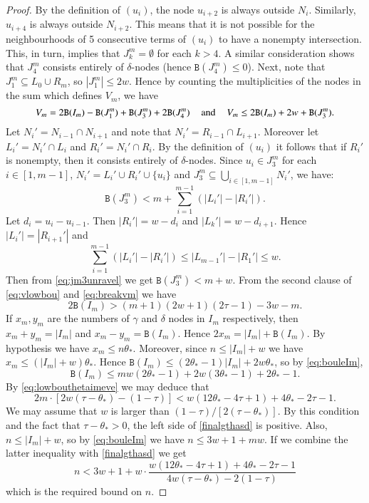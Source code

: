 \documentclass[11pt]{article}
\theoremstyle{plain}
\numberwithin{equation}{subsection}
\newcommand{\bias}[1]{\mathtt{B}(#1)}
\begin{document}
\begin{proof}
By the definition of $(u_i)$, the node $u_{i+2}$ is always outside $N_i$.
Similarly, $u_{i+4}$ is always outside $N_{i+2}$. 
This means that it is not possible for the neighbourhoods
of 5 consecutive terms of $(u_i)$ to have a nonempty intersection. 
This, in turn, implies that 
$J^m_k=\emptyset$ for each $k>4$. 
A similar consideration shows 
that $J^m_4$ consists entirely of $\delta$-nodes
(hence $\bias{J^m_4}\leq 0$).
Next, note that $J_1^m\subseteq L_0\cup R_m$, so $|J_1^m|\leq 2w$.
Hence by counting the multiplicities of the nodes in the sum which defines 
$V_m$, we have 
\begin{equation}\label{eq:breakvm}
V_m = 2\bias{I_m}-\bias{J^m_1}+\bias{J^m_3} +2\bias{J^m_4}\hspace{0.4cm}\textrm{and}\hspace{0.4cm}
V_m \leq 2\bias{I_m}+2w+\bias{J^m_3}.
\end{equation}
Let $N_i'=N_{i-1}\cap N_{i+1}$ and note that $N_i'=R_{i-1}\cap L_{i+1}$.
Moreover let $L_i'=N_i'\cap L_i$ and $R_i'=N_i'\cap R_i$.
By the definition of $(u_i)$ it follows that if 
$R_i'$ is nonempty, then it consists entirely
of $\delta$-nodes.
Since $u_i\in J^m_3$ for each 
$i\in [1, m-1]$, $N_i'=L_{i}'\cup R_i'\cup\{u_i\}$ and 
$J^m_3\subseteq\bigcup_{i\in [1, m-1]} N_i'$, 
we have:
\begin{equation}\label{eq:jm3unravel}
\bias{J^m_3}< m + \sum_{i=1}^{m-1} (|L_i'|-|R_i'|).
\end{equation}
Let $d_i=u_i-u_{i-1}$. 
Then $|R_i'|=w-d_i$ and $|L_k'|=w-d_{i+1}$.
Hence  $|L_i'|=|R_{i+1}'|$ and
\[
\sum_{i=1}^{m-1} (|L_i'|-|R_i'|)\leq |L_{m-1}'|-|R_{1}'|\leq w.
\]
Then from \eqref{eq:jm3unravel} we get
$\bias{J_3^m}< m+w$.
From the second clause of \eqref{eq:vlowbou} and 
\eqref{eq:breakvm} we have
\begin{equation}\label{eq:lowbouthetaimeve}
2\bias{I_m} > (m+1)(2w+1)(2\tau-1)-3w-m.
\end{equation}
If $x_m,y_m$ are the numbers of  $\gamma$ and $\delta$ nodes 
in $I_m$ respectively, then $x_m+y_m=|I_m|$ 
and $x_m-y_m=\bias{I_m}$.
Hence $2x_m=|I_m|+\bias{I_m}$. 
By hypothesis we have $x_m\leq n\theta_{\ast}$.
Moreover, since $n\leq |I_m| +w$ 
we have $x_m\leq (|I_m| +w)\theta_{\ast}$.
Hence
$\bias{I_m}\leq (2\theta_{\ast}-1)|I_m| + 2w\theta_{\ast}$, so
by \eqref{eq:bouleIm}, 
\[
\bias{I_m}\leq  mw(2\theta_{\ast}-1) + 2w(3\theta_{\ast}-1) +2\theta_{\ast}-1.
\]
By \eqref{eq:lowbouthetaimeve}  we may deduce that 
\begin{equation}\label{finalgthasd}
2m\cdot [2w(\tau-\theta_{\ast})-(1-\tau)]< 
w(12\theta_{\ast}-4\tau+1)  +4\theta_{\ast}-2\tau-1.
\end{equation}
We may assume that 
$w$ is larger than $(1-\tau)/[2(\tau-\theta_{\ast})]$.
By this condition and the fact that 
$\tau-\theta_{\ast}> 0$,  
the left side of \eqref{finalgthasd} is positive. 
Also, $n\leq |I_m|+w$, so by \eqref{eq:bouleIm} 
we have $n\leq 3w+1+mw$.
If we combine the latter inequality with \eqref{finalgthasd} we get
\[
n< 3w+1 + w\cdot \frac{w(12\theta_{\ast}-4\tau+1)  +4\theta_{\ast}-2\tau-1}{4w(\tau-\theta_{\ast})-2(1-\tau)}
\]
which is the required bound on $n$.
\end{proof}
\end{document}
